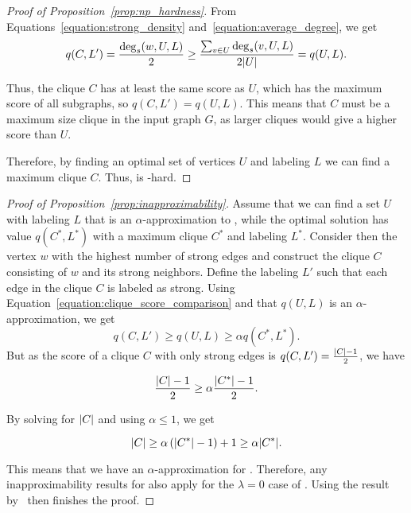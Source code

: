 \begin{proof}[Proof of Proposition~\ref{prop:np_hardness}]
From Equations~\ref{equation:strong_density} and~\ref{equation:average_degree}, we get 
\begin{equation}
\label{equation:clique_score_comparison}
q(C, L') = \frac{\deg_s(w, U, L)}{2} \geq \frac{\sum_{v \in U} \deg_s(v, U, L)}{2{\left|U\right|}} = q(U, L).
\end{equation}

Thus, the clique $C$ has at least the same score as $U$, which has the maximum score of all subgraphs, so $q(C, L') = q(U, L)$. This means that $C$ must be a maximum size clique in the input graph $G$, as larger cliques would give a higher score than $U$.

Therefore, by finding an optimal set of vertices $U$ and labeling $L$ we can find a maximum clique $C$. Thus, \prbstrwk is \np-hard.
\end{proof}


\begin{proof}[Proof of Proposition~\ref{prop:inapproximability}]
Assume that we can find a set $U$ with labeling $L$ that is an $\alpha$-approximation to \prbstrwk, while the optimal solution has value $q(C^*, L^*)$ with a maximum clique $C^*$ and labeling $L^*$. Consider then the vertex $w$ with the highest number of strong edges and construct the clique $C$ consisting of $w$ and its strong neighbors. Define the labeling $L'$ such that each edge in the clique $C$ is labeled as strong. Using Equation~\ref{equation:clique_score_comparison} and that $q(U, L)$ is an $\alpha$-approximation, we get 
\begin{equation*}
q(C, L') \geq q(U, L) \geq \alpha q(C^*, L^*).
\end{equation*}
But as the score of a clique $C$ with only strong edges is $q(C, L') = \frac{{\left|C\right|}-1}{2}$, we have 

\begin{equation*}
\frac{{\left|C\right|}-1}{2} \geq \alpha\frac{{\left|C^*\right|}-1}{2}.
\end{equation*}

By solving for ${\left|C\right|}$ and using $\alpha \leq 1$, we get

\begin{equation*}
{\left|C\right|} \geq \alpha \left({\left|C^*\right|}-1\right) + 1 \geq \alpha{\left|C^*\right|}.
\end{equation*}

This means that we have an $\alpha$-approximation for \prbmaxclique.
Therefore, any inapproximability results for \prbmaxclique also apply for the $\lambda = 0$ case of \prbstrwk. Using the result by~\citet{zuckerman2006linear} then finishes the proof.
\end{proof}


